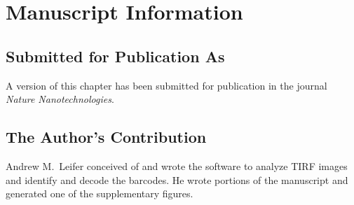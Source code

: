 


\section{Manuscript Information}
\subsection{Submitted for Publication As}
A version of this chapter has been submitted for publication in the journal \textit{Nature Nanotechnologies}.

\subsection{The Author's Contribution}
Andrew M.~Leifer conceived of and wrote the software to analyze TIRF images and identify and decode the barcodes. He wrote portions of the manuscript and generated one of the supplementary figures. 